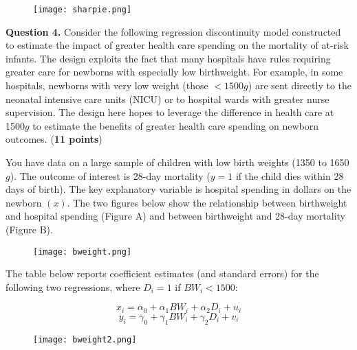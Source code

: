 \documentclass[12pt]{article}
\begin{document}
\bigskip
\bigskip
\begin{figure}[H]
\begin{center}
\texttt{[image: sharpie.png]} 
\end{center}
\end{figure}

\pagebreak



\textbf{Question 4.} Consider the following regression discontinuity model constructed to estimate the impact of greater health care spending on the mortality of at-risk infants. The design exploits the fact that many hospitals have rules requiring greater care for newborns with especially low birthweight. For example, in some hospitals, newborns with very low weight (those $<1500g$) are sent directly to the neonatal intensive care units (NICU) or to hospital wards with greater nurse supervision. The design here hopes to leverage the difference in health care at 1500$g$ to estimate the benefits of greater health care spending on newborn outcomes. ({\bf 11 points})

\bigskip
You have data on a large sample of children with low birth weights (1350 to 1650 $g$). The outcome of interest is 28-day mortality ($y=1$ if the child dies within 28 days of birth). The key explanatory variable is hospital spending in dollars on the newborn $(x)$. The two figures below show the relationship between birthweight and hospital spending (Figure A) and between birthweight and 28-day mortality (Figure B).

\begin{figure}[H]
\begin{center}
\texttt{[image: bweight.png]} 
\end{center}
\end{figure}

The table below reports coefficient estimates (and standard errors) for the following two regressions, where $D_i=1$ if $BW_i<1500$: 

$$ x_i = \alpha_0 + \alpha_1 BW_i + \alpha_2 D_i + u_i $$
$$ y_i = \gamma_0 + \gamma_1 BW_i + \gamma_2 D_i + v_i $$

\begin{figure}[H]
\begin{center}
\texttt{[image: bweight2.png]} 
\end{center}
\end{figure}
\end{document}
